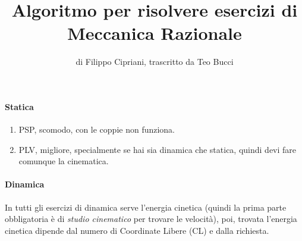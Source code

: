 \documentclass{article}
\title{Algoritmo per risolvere esercizi di Meccanica Razionale}
\date{}
\author{di Filippo Cipriani, trascritto da Teo Bucci}
\begin{document}
\maketitle

\paragraph{Statica}

\begin{enumerate}
    \item PSP, scomodo, con le coppie non funziona.
    \item PLV, migliore, specialmente se hai sia dinamica che statica, quindi devi fare comunque la cinematica.
\end{enumerate}

\paragraph{Dinamica}

In tutti gli esercizi di dinamica serve l'energia cinetica (quindi la prima parte obbligatoria è di \textit{studio cinematico} per trovare le velocità), poi, trovata l'energia cinetica dipende dal numero di Coordinate Libere (CL) e dalla richiesta.
\end{document}
